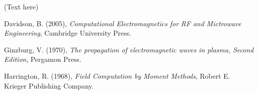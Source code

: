 \documentclass[two-column,ras]{agutex}
\begin{document}
\begin{article}
%
%
%
%

\begin{acknowledgments}
(Text here)
\end{acknowledgments}

%
%
%
%
%
%
%
%
%
%

\begin{thebibliography}{}
Davidson, B. (2005), \textit{Computational Electromagnetics for RF and
  Mictrowave Engineering}, Cambridge University Press.

Ginzburg, V. (1970), \textit{The propagation of electromagnetic waves in
  plasma, Second Edition}, Pergamon Press.

Harrington, R. (1968), \textit{Field Computation by Moment Methods}, Robert E.
  Krieger Publishing Company.


\end{thebibliography}
\end{article}
\end{document}
